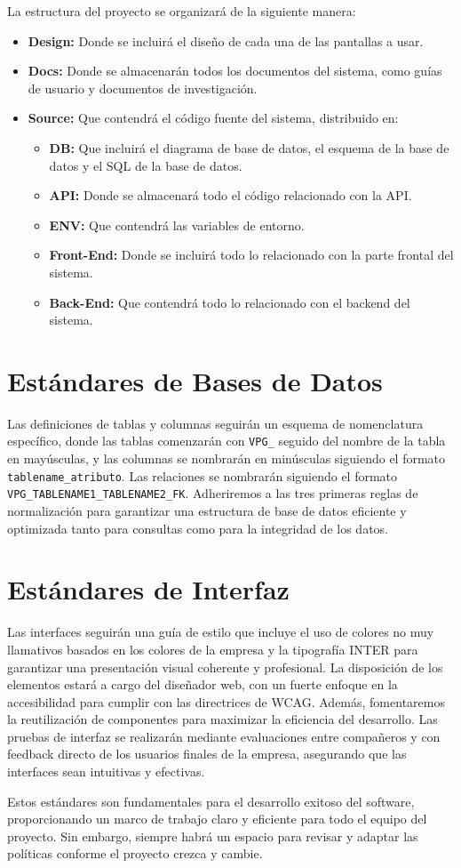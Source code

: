 La estructura del proyecto se organizará de la siguiente manera: 
\begin{itemize}
    \item \textbf{Design:} Donde se incluirá el diseño de cada una de las pantallas a usar.
    \item \textbf{Docs:} Donde se almacenarán todos los documentos del sistema, como guías 
    de usuario y documentos de investigación.
    \item \textbf{Source:} Que contendrá el código fuente del sistema, distribuido en:
    \begin{itemize}
        \item \textbf{DB:} Que incluirá el diagrama de base de datos, el esquema de la 
        base de datos y el SQL de la base de datos.
        \item \textbf{API:} Donde se almacenará todo el código relacionado con la API.
        \item \textbf{ENV:} Que contendrá las variables de entorno.
        \item \textbf{Front-End:} Donde se incluirá todo lo relacionado con la parte frontal 
        del sistema.
        \item \textbf{Back-End:} Que contendrá todo lo relacionado con el backend del sistema.
    \end{itemize}
\end{itemize}

\section{\textbf{Estándares de Bases de Datos}}

Las definiciones de tablas y columnas seguirán un esquema de nomenclatura específico, 
donde las tablas comenzarán con \texttt{VPG\_} seguido del nombre de la tabla en mayúsculas, 
y las columnas se nombrarán en minúsculas siguiendo el formato \texttt{tablename\_atributo}. 
Las relaciones se nombrarán siguiendo el formato \texttt{VPG\_TABLENAME1\_TABLENAME2\_FK}. 
Adheriremos a las tres primeras reglas de normalización para garantizar una estructura de 
base de datos eficiente y optimizada tanto para consultas como para la integridad de los datos.

\section{\textbf{Estándares de Interfaz}}

Las interfaces seguirán una guía de estilo que incluye el uso de colores no muy 
llamativos basados en los colores de la empresa y la tipografía INTER para garantizar 
una presentación visual coherente y profesional. La disposición de los elementos estará a 
cargo del diseñador web, con un fuerte enfoque en la accesibilidad para cumplir con las 
directrices de WCAG. Además, fomentaremos la reutilización de componentes para maximizar la 
eficiencia del desarrollo. Las pruebas de interfaz se realizarán mediante evaluaciones 
entre compañeros y con feedback directo de los usuarios finales de la empresa, asegurando 
que las interfaces sean intuitivas y efectivas.

Estos estándares son fundamentales para el desarrollo exitoso del software, proporcionando un 
marco de trabajo claro y eficiente para todo el equipo del proyecto. Sin embargo, siempre habrá 
un espacio para revisar y adaptar las políticas conforme el proyecto crezca y cambie.
